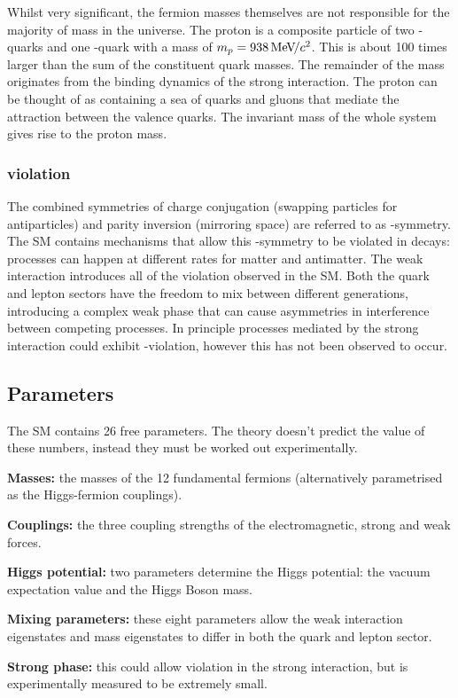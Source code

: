 Whilst very significant, the fermion masses themselves are not responsible for the majority of mass in the universe. The proton is a composite particle of two \uquark-quarks and one \dquark-quark with a mass of $m_{{p}}=938{\mathrm{\,Me\kern -0.1em V\!/}c^2}$. This is about 100 times larger than the sum of the constituent quark masses. The remainder of the mass originates from the  binding dynamics of the strong interaction. The proton can be thought of as containing a sea of quarks and gluons that mediate the attraction between the valence quarks. The invariant mass of the whole system gives rise to the proton mass. 
 

\subsubsection{\CP violation}

The combined symmetries of charge conjugation (swapping particles for antiparticles) and parity inversion (mirroring space) are referred to as \CP-symmetry. The SM contains mechanisms that allow this \CP-symmetry to be violated in decays: processes can happen at different rates for matter and antimatter.  
The weak interaction introduces all of the \CP violation observed in the SM. Both the quark and lepton sectors have the freedom to mix between different generations, introducing a complex weak phase that can cause asymmetries in interference between competing processes. In principle processes mediated by the strong interaction could exhibit \CP-violation, however this has not been observed to occur. 

\subsection{Parameters}

The SM contains 26 free parameters. The theory doesn't predict the value of these numbers, instead they must be worked out experimentally.  
\begin{description}
\item \textbf{Masses:} the masses of the 12 fundamental fermions (alternatively parametrised as the Higgs-fermion couplings).
\item \textbf{Couplings:} the three coupling strengths of the electromagnetic, strong and weak forces.
\item \textbf{Higgs potential:} two parameters determine the Higgs potential: the vacuum expectation value and the Higgs Boson mass.
\item \textbf{Mixing parameters:} these eight parameters allow the weak interaction eigenstates and mass eigenstates to differ in both the quark and lepton sector.
\item \textbf{Strong \CP  phase:} this could allow \CP violation in the strong interaction, but is experimentally measured to be extremely small.
\end{description}

